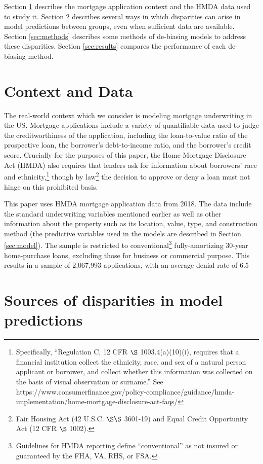 Section \ref{sec:data} describes the mortgage application context and the HMDA data used to study it. Section \ref{sec:disparities} describes several ways in which disparities can arise in model predictions between groups, even when sufficient data are available. Section \ref{sec:methods} describes some methods of de-biasing models to address these disparities. Section \ref{sec:results} compares the performance of each de-biasing method. 

\section{Context and Data}\label{sec:data}

The real-world context which we consider is modeling mortgage underwriting in the US. Mortgage applications include a variety of quantifiable data used to judge the creditworthiness of the application, including the loan-to-value ratio of the prospective loan, the borrower's debt-to-income ratio, and the borrower's credit score. Crucially for the purposes of this paper, the Home Mortgage Disclosure Act (HMDA) also requires that lenders ask for information about borrowers' race and ethnicity,\footnote{Specifically, ``Regulation C, 12 CFR $\S$ 1003.4(a)(10)(i), requires that a financial institution collect the ethnicity, race, and sex of a natural person applicant or borrower, and collect whether this information was collected on the basis of visual observation or surname.'' See https://www.consumerfinance.gov/policy-compliance/guidance/hmda-implementation/home-mortgage-disclosure-act-faqs/} though by law\footnote{Fair Housing Act (42 U.S.C. $\S\S$ 3601-19) and Equal Credit Opportunity Act (12 CFR $\S$ 1002).\label{fn:FHAECOA}} the decision to approve or deny a loan must not hinge on this prohibited basis. 

This paper uses HMDA mortgage application data from 2018. The data include the standard underwriting variables mentioned earlier as well as other information about the property such as its location, value, type, and construction method (the predictive variables used in the models are described in Section \ref{sec:model}). The sample is restricted to conventional\footnote{Guidelines for HMDA reporting define ``conventional'' as not insured or guaranteed by the FHA, VA, RHS, or FSA.} fully-amortizing 30-year home-purchase loans, excluding those for business or commercial purpose. This results in a sample of 2,067,993 applications, with an average denial rate of 6.5\
\section{Sources of disparities in model predictions}\label{sec:disparities}

